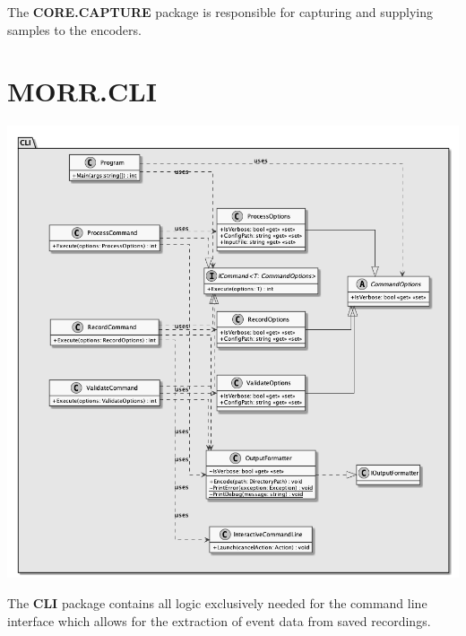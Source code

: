 The \textbf{CORE.CAPTURE} package is responsible for capturing and supplying samples to the encoders.

\begin{packif}
\end{packif}

\begin{packclass}
\end{packclass}

\newpage
\section{MORR.CLI}

\begin{center}
    \includegraphics[width=1.0\textwidth]{resources/Packages/CLI.png}
\end{center}

The \textbf{CLI} package contains all logic exclusively needed for the command line interface which allows for the extraction of event data from saved recordings.

\begin{packif}
\end{packif}

